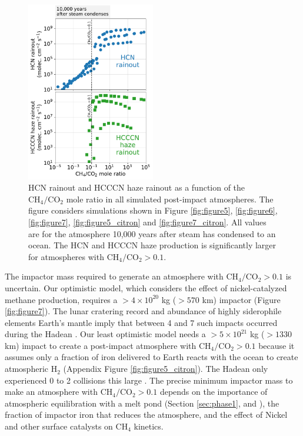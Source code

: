 \begin{figure}
  \centering
  \includegraphics[width=0.5\textwidth]{tex/5impacts/figures/Figure7_5.pdf}
  \caption{HCN rainout and HCCCN haze rainout as a function of the $\mathrm{CH_4}/\mathrm{CO_2}$ mole ratio in all simulated post-impact atmospheres. The figure considers simulations shown in Figure \ref{fig:figure5}, \ref{fig:figure6}, \ref{fig:figure7}, \ref{fig:figure5_citron} and \ref{fig:figure7_citron}. All values are for the atmosphere 10,000 years after steam has condensed to an ocean. The HCN and HCCCN haze production is significantly larger for atmospheres with $\mathrm{CH_4}/\mathrm{CO_2} > 0.1$.}
  \label{fig:figure7_5}
\end{figure}

The impactor mass required to generate an atmosphere with $\mathrm{CH_4}/\mathrm{CO_2} > 0.1$ is uncertain. Our optimistic model, which considers the effect of nickel-catalyzed methane production, requires a $> 4 \times 10^{20}$ kg ($> 570$ km) impactor (Figure \ref{fig:figure7}). The lunar cratering record and abundance of highly siderophile elements Earth's mantle imply that between 4 and 7 such impacts occurred during the Hadean \citep{Marchi_2014, Zahnle_2020}. Our least optimistic model needs a $> 5 \times 10^{21}$ kg ($> 1330$ km) impact to create a post-impact atmosphere with $\mathrm{CH_4}/\mathrm{CO_2} > 0.1$ because it assumes only a fraction of iron delivered to Earth reacts with the ocean to create atmospheric H$_2$ (Appendix Figure \ref{fig:figure5_citron}). The Hadean only experienced 0 to 2 collisions this large \citep{Zahnle_2020}. The precise minimum impactor mass to make an atmosphere with $\mathrm{CH_4}/\mathrm{CO_2} > 0.1$ depends on the importance of atmospheric equilibration with a melt pond (Section \ref{sec:phase1}, and \citet{Itcovitz_2022}), the fraction of impactor iron that reduces the atmosphere, and the effect of Nickel and other surface catalysts on CH$_4$ kinetics.

